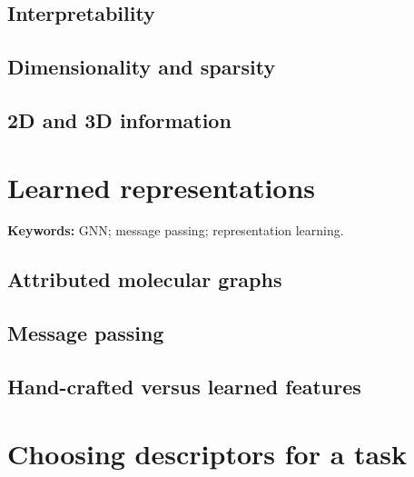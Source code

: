 \subsection{Interpretability}


\subsection{Dimensionality and sparsity}


\subsection{2D and 3D information}


\section{Learned representations}

\begin{conceptbox}
\textbf{Keywords:} GNN; message passing; representation learning.
\end{conceptbox}

\subsection{Attributed molecular graphs}


\subsection{Message passing}


\subsection{Hand-crafted versus learned features}


\section{Choosing descriptors for a task}

